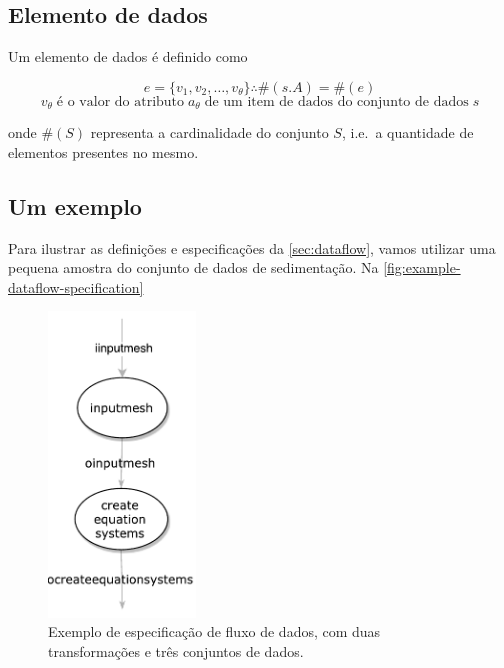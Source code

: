 \subsection{Elemento de dados}

Um elemento de dados é definido como

\[ e = \{ v_1, v_2, \ldots, v_{\theta} \} \therefore \#(s.A) = \#(e) \]
\[ v_{\theta} \; \textrm{é o valor do atributo} \; a_{\theta} \; \textrm{de um item de dados do conjunto de dados} \; s \]

onde \( \#(S) \) representa a cardinalidade do conjunto \( S \), i.e.\ a quantidade de elementos presentes no mesmo.

\subsection{Um exemplo}%
\label{sec:um-exemplo-de-dataflow}

Para ilustrar as definições e especificações da \autoref{sec:dataflow}, vamos utilizar uma pequena amostra do conjunto de dados de sedimentação. Na \autoref{fig:example-dataflow-specification} 

\begin{figure}[ht]
    \centering
    \includegraphics[width=0.35\textwidth]{img/example-dataflow-specification}
    \caption[Exemplo de especificação de fluxo de dados]{Exemplo de especificação de fluxo de dados, com duas transformações e três conjuntos de dados.}%
    \label{fig:example-dataflow-specification}
\end{figure}



